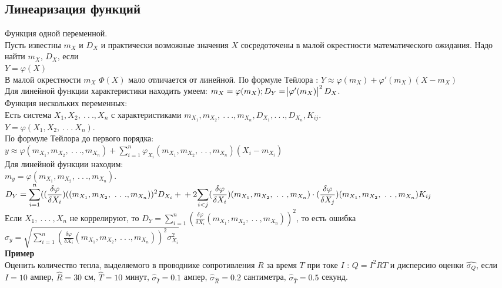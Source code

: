 \documentclass[russian, 12pt, fleqn]{article}
\begin{document}
\subsection{Линеаризация функций}
\noindent
Функция одной переменной. \\
Пусть известны $m_X$ и $D_X$ и практически возможные значения $X$ сосредоточены в малой окрестности математического ожидания. Надо найти $m_X$, $D_X$, если \\
$Y = \varphi(X)$\\
В малой окрестности $m_X$ $\Phi(X)$ мало отличается от линейной. По формуле Тейлора : $Y \approx \varphi(m_X) + \varphi'(m_X) (X  - m_X)$\\
Для линейной функции характеристики находить умеем: $m_X = \varphi(m_X);\\ D_Y = \abs{\varphi'(m_X)}^2 D_X$.\\
Функция нескольких переменных:\\
Есть система $X_1, X_2,\ .\ .\ . ,X_n$ с характеристиками $m_{X_1}, m_{X_2}, \ .\ .\ .  ,m_{X_n}, D_{X_1},.\ .\ ., D_{X_n}, K_{ij}$.\\
$Y=\varphi(X_1, X_2, \ .\ .\ .\  X_n)$.\\
По формуле Тейлора до первого порядка:\\
 $y  \approx  \varphi(m_{X_1}, m_{X_2}, \ .\ .\ .  ,m_{X_n}) + \displaystyle{\sum \limits _{i  = 1} ^ {n} } \varphi_{X_i} (m_{X_1}, m_{X_2}, \ .\ .\ ,m_{X_n})(X_i - m_{X_i})$\\
Для линейной функции находим:\\
$m_y =  \varphi(m_{X_1}, m_{X_2}, \ .\ .\ . ,m_{X_n}) $. $D_Y =  \displaystyle{\sum \limits _{i  = 1} ^ {n} } ((\frac{\delta \varphi}{\delta X_i})((m_{X_1}, m_{X_2}, \ .\ .\ . , m_{X_n}))^2D_{X_i}  + \\ + 2\displaystyle{\sum \limits _{i  < j} } (\frac{\delta \varphi}{\delta X_i}) (m_{X_1}, m_{X_2}, \ .\ .\ ,m_{X_n})  \cdot (\frac{\delta \varphi}{\delta X_j}) (m_{X_1}, m_{X_2}, \ .\ .\ ,m_{X_n}) K_{ij}$\\
Если $X_1, \ .\ .\ .\ ,X_n$ не коррелируют, то $D_Y =  \displaystyle{\sum \limits _{i  = 1} ^ {n} } (\frac{\delta \varphi}{\delta X_i} (m_{X_1}, m_{X_2}, \ .\ .\ ,m_{X_n}))^2$, то есть ошибка $\sigma_y  = \sqrt{\displaystyle{\sum \limits _{i  = 1} ^ {n} } (\frac{\delta \varphi}{\delta X_i}(m_{X_1}, m_{X_2}, \ .\ .\ . , m_{X_n}))^2 \sigma_{X_i}^2}$\\
\textbf{Пример} \\
Оценить количество тепла, выделяемого в проводнике сопротивления $R$ за время $T$ при токе $I$ : $Q=I^2RT$ и дисперсию оценки $\hat{\sigma_Q}$, если $I=10$ ампер, $\hat{R} = 30$ см, $\hat{T} = 10$ минут, $\hat{\sigma}_{\hat{I}} = 0.1$ ампер, $\hat{\sigma}_{\hat{R}} = 0.2$ сантиметра, $\hat{\sigma}_{\hat{T}} = 0.5$ секунд.\\
\end{document}
